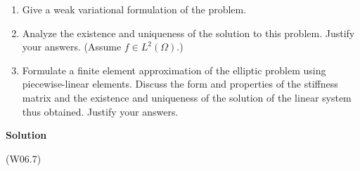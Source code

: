 \documentclass{article}
\begin{document}
\begin{enumerate}
\begin{enumerate}
\item Give a weak variational formulation of the problem.

\item Analyze the existence and uniqueness of the solution to this problem.  Justify your answers.  (Assume \(f \in L^2(\Omega)\).)

\item Formulate a finite element approximation of the elliptic problem using piecewise-linear elements.  Discuss the form and properties of the stiffness matrix and the existence and uniqueness of the solution of the linear system thus obtained.  Justify your answers.

\end{enumerate}

{\bf Solution}

(W06.7)



\end{enumerate}
\end{document}
